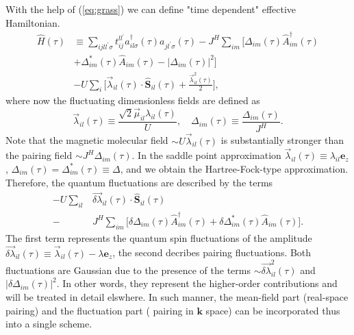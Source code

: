 \documentclass[aps,prb,showpacs,reprint]{revtex4-1}
\begin{document}
With the help of (\ref{eq:grass}) we can define "time dependent" effective
Hamiltonian.
\begin{equation}
\begin{split}
 \hat{H}(\tau)&\equiv
\sum_{ijll^{\prime}\sigma}t^{ll^{\prime}}_{ij}a^{\dagger}_{il\sigma}(\tau)a_{
jl^{\prime}\sigma}(\tau)-J^H\sum_{im}\bigg[\Delta_{im}(\tau)
\hat{A}^{\dagger}_{im}(\tau)\\
&+\Delta^*_{im}(\tau)
\hat{A}_{im}(\tau)-|\Delta_{im}(\tau)|^2\bigg]\\
&-U\sum_i\bigg[\vec{\lambda}
_{il}(\tau)\cdotp\mathbf{ \hat{S}}_{il}(\tau)+\frac{\vec{\lambda}_{il}^2(\tau)}{2} \bigg],
\end{split}
\end{equation}
where now the fluctuating dimensionless fields are defined as
\begin{equation}
 \vec{\lambda}_{il}(\tau)\equiv\frac{\sqrt{2}\vec{\mu}_{il}\lambda_{il}(\tau)}{U},
\quad \Delta_{im}(\tau)\equiv\frac{\Delta_{im}(\tau)}{J^H}. 
\end{equation}
Note that the magnetic molecular field $\sim U\vec{\lambda}_{il}(\tau)$ is substantially stronger than the pairing field $\sim J^H \Delta_{im}(\tau)$. In the saddle point approximation
$\vec{\lambda}_{il}(\tau)\equiv \lambda_{il} \mathbf{e}_z$,
$\Delta_{im}(\tau)=\Delta^*_{im}(\tau)\equiv \Delta$, and we obtain the
Hartree-Fock-type approximation. Therefore, the quantum fluctuations are described by
the terms
\begin{equation}
\begin{split}
 -U\sum_{il}& \vec{\delta \lambda}
_{il}(\tau)\cdotp \mathbf{\hat{S}}_{il}(\tau)\\
-&J^H\sum_{im}\bigg[\delta\Delta_{im}(\tau)
\hat{A}^{\dagger}_{im}(\tau)+\delta\Delta^*_{im}(\tau)
\hat{A}_{im}(\tau)\bigg].
\end{split}
\end{equation}
The first term represents the quantum spin fluctuations of the amplitude
$ \vec{\delta \lambda}_{il}(\tau)\equiv \vec{\lambda}_{il}(\tau)-\lambda\mathbf{e}_z$, the second
decribes pairing fluctuations. Both fluctuations are Gaussian due to the presence of
the terms $\sim \vec{\delta\lambda}^2_{il}(\tau)$ and $|\delta\Delta_{im}(\tau)|^2$. In other
words, they represent the higher-order contributions and will be treated in
detail elswhere. In such manner, the mean-field part (real-space pairing) and
the fluctuation part ( pairing in $\mathbf{k}$ space) can be incorporated thus
into a single scheme.
\end{document}
